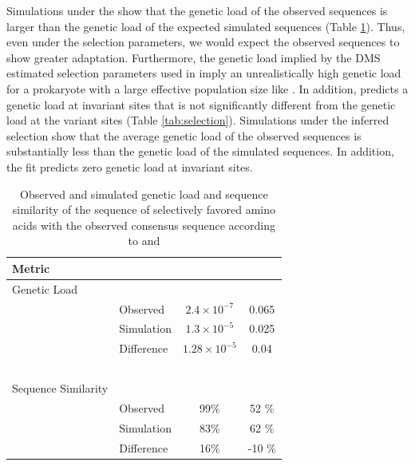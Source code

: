 \documentclass[fleqn,letterpaper]{article}
\begin{document}
Simulations under the \phydms show that the genetic load of the observed sequences is larger than the genetic load of the expected simulated sequences (Table \ref{tab:gl_ss}).
Thus, even under the \phydms selection parameters, we would expect the observed sequences to show greater adaptation.
Furthermore, the genetic load implied by the DMS estimated selection parameters used in \phydms imply an unrealistically high genetic load for a prokaryote with a large effective population size like \ecoli.
In addition, \phydms predicts a genetic load at invariant sites that is not significantly different from the genetic load at the variant sites (Table \ref{tab:selection}).
Simulations under the \selac inferred selection show that the average genetic load of the observed sequences is substantially less than the genetic load of the simulated sequences. 
In addition, the \selac fit predicts zero genetic load at invariant sites.


\begin{table}
  \centering
  \caption{Observed and simulated genetic load and sequence similarity of the sequence of selectively favored amino acids with the observed consensus sequence according to \selac and \phydms}
  \begin{tabular}{llcc}
    \hline
	Metric					& 				& \selac 				& \phydms \\ \hline 
	Genetic Load		 	& 				& 						&		\\
   							&Observed		&$2.4\times 10^{-7}$	& 0.065 \\
    							&Simulation	&$1.3 \times 10^{-5}$ & 0.025 \\ \cline{2-4}
							&Difference	&$1.28 \times 10^{-5}$& 0.04 \\
\ \\ \hline
	Sequence Similarity 	& 				& 						&		\\
   							&Observed		&  	99\%				& 52 \% \\
    							&Simulation	&	83\%				& 62 \% \\ \cline{2-4}
							&Difference	& 	16\%				& -10 \% \\ \hline
  \end{tabular}
  \label{tab:gl_ss}
\end{table}
\end{document}
